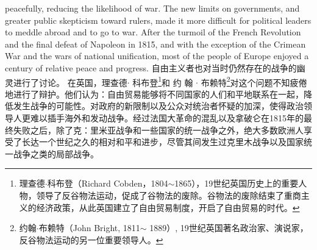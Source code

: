\begin{paracol}{2}
peacefully, reducing the likelihood of war. The new limits on
governments, and greater public skepticism toward rulers,
made it more difficult for political leaders to meddle abroad and
to go to war. After the turmoil of the French Revolution and the
final defeat of Napoleon in 1815, and with the exception of the
Crimean War and the wars of national unification, most of the
people of Europe enjoyed a century of relative peace and
progress.
\switchcolumn
自由主义者也对当时仍然存在的战争的幽灵进行了讨论。
在英国，理查德$\cdot$ 科布登\footnote{理查德$\cdot$科布登（Richard Cobden，1804$\sim$1865），19世纪英国历史上的重要人物，领导了反谷物法运动，促成了谷物法的废除。谷物法的废除结束了重商主义的经济政策，从此英国建立了自由贸易制度，开启了自由贸易的时代。}和 约 翰 $\cdot$ 布赖特\footnote{约翰$\cdot$布赖特（John Bright, 1811$\sim$ 1889）, 19世纪英国著名政治家、演说家，反谷物法运动的另一位重要领导人。}对这个问题不知疲倦地进行了辩护。他们认为：自由贸易能够将不同国家的人们和平地联系在一起，降低发生战争的可能性。对政府的新限制以及公众对统治者怀疑的加深，使得政治领导人更难以插手海外和发动战争。经过法国大革命的混乱以及拿破仑在1815年的最终失败之后，除了克：里米亚战争和一些国家的统一战争之外，绝大多数欧洲人享受了长达一个世纪之久的相对和平和进步，尽管其间发生过克里木战争以及国家统一战争之类的局部战争。


\end{paracol}
